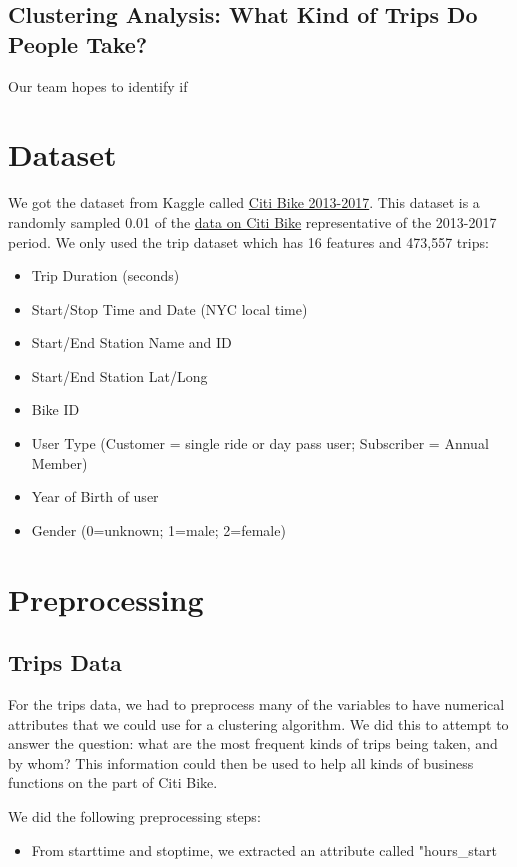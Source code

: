 \documentclass{article}
\begin{document}
\subsection{Clustering Analysis: What Kind of Trips Do People Take?}
Our team hopes to identify if

\section{Dataset}
We got the dataset from Kaggle called \href{https://www.kaggle.com/datasets/fatihb/citibike-sampled-data-2013-2017?resource=download}{Citi Bike 2013-2017}. This dataset is a randomly sampled 0.01 of the \href{https://citibikenyc.com/system-data}{data on Citi Bike} representative of the 2013-2017 period. We only used the trip dataset which has 16 features and 473,557 trips:
\begin{itemize}
    \item Trip Duration (seconds)
    \item Start/Stop Time and Date (NYC local time)
    \item Start/End Station Name and ID
    \item Start/End Station Lat/Long
    \item Bike ID
    \item User Type (Customer = single ride or day pass user; Subscriber = Annual Member)
    \item Year of Birth of user
    \item Gender (0=unknown; 1=male; 2=female)
\end{itemize}

\section{Preprocessing}
\subsection{Trips Data}
For the trips data, we had to preprocess many of the variables to have numerical attributes that we could use for a clustering algorithm. We did this to attempt to answer the question: what are the most frequent kinds of trips being taken, and by whom? This information could then be used to help all kinds of business functions on the part of Citi Bike. 

We did the following preprocessing steps:
\begin{itemize}
    \item From starttime and stoptime, we extracted an attribute called "hours\_start 
\end{itemize}
\end{document}
